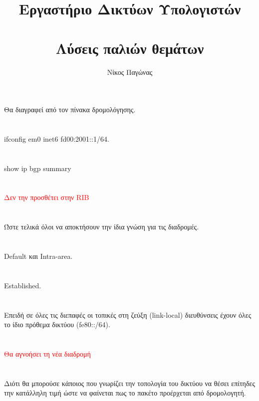 \documentclass[a4paper, 12pt]{article}
\title{
	\textbf{Εργαστήριο Δικτύων Υπολογιστών} \\~\\
	Λύσεις παλιών θεμάτων
}
\author{Νίκος Παγώνας}
\date{}
\begin{document}
\maketitle

\section{}
	Θα διαγραφεί από τον πίνακα δρομολόγησης.
	
\section{}
	ifconfig em0 inet6 fd00:2001::1/64.

\section{}
	show ip bgp summary

\section{}
	\textcolor{red}{Δεν την προσθέτει στην RIB}

\section{}
	Ώστε τελικά όλοι να αποκτήσουν την ίδια γνώση για τις διαδρομές.

\section{}
	Default και Intra-area.

\section{}
	Established.

\section{}
	Επειδή σε όλες τις διεπαφές οι τοπικές στη ζεύξη (link-local) διευθύνσεις έχουν όλες το ίδιο
	πρόθεμα δικτύου (fe80::/64).

\section{}
	\textcolor{red}{Θα αγνοήσει τη νέα διαδρομή}

\section{}
	Διότι θα μπορούσε κάποιος που γνωρίζει την τοπολογία του δικτύου να θέσει επίτηδες την κατάλληλη τιμή ώστε να φαίνεται πως το πακέτο προέρχεται από δρομολογητή.
\end{document}
